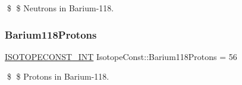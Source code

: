 \$ \$ Neutrons in Barium-\/118. \mbox{\label{group___isotope_const-_barium-_ba118_ga3381809fe288d6da8708ab258d949169}} 
\subsubsection{\texorpdfstring{Barium118\+Protons}{Barium118Protons}}
{\footnotesize\ttfamily \mbox{\hyperlink{group___isotope_const-_macros_ga5f18360b3e99483a35c32d789e62621c}{I\+S\+O\+T\+O\+P\+E\+C\+O\+N\+S\+T\+\_\+\+I\+NT}} Isotope\+Const\+::\+Barium118\+Protons = 56}

\$ \$ Protons in Barium-\/118. 